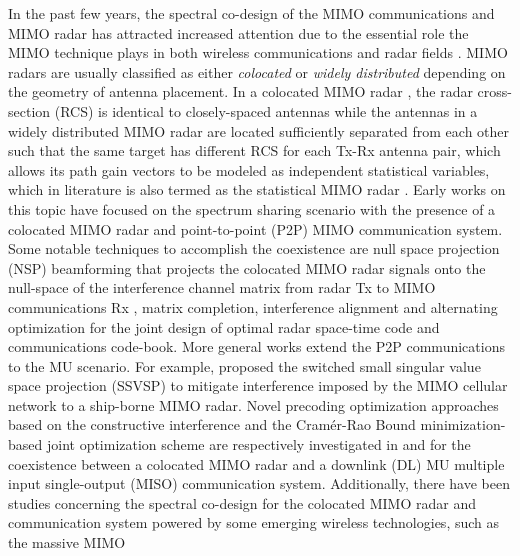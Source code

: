 \documentclass[9pt,journal]{IEEEtran}
\begin{document}
In the past few years, the spectral co-design of the MIMO communications and MIMO radar has attracted increased attention due to the essential role the MIMO technique plays in both wireless communications and radar fields \cite{MCMIMO_RadComm,qian2018joint,rihan2018optimum,liu2018mimo,MIMOCOMSecrecy,he2019performance,cheng2019miso,dokhanchi2020multi,alaee2020information}. 
MIMO radars 
are usually classified as either \textit{colocated} or \textit{widely distributed} depending on the geometry of antenna placement. In a colocated MIMO radar \cite{mishra2019cognitive}, the radar cross-section (RCS) is identical to closely-spaced antennas while the antennas in a widely distributed MIMO radar are located sufficiently separated from each other such that the same target has different RCS for each Tx-Rx antenna pair, which allows its path gain vectors to be modeled as independent statistical variables, which in literature is also termed as the statistical MIMO radar \cite{hongbin_movingtarget,Jammer_game,NaghshTSP2017,sun2019target}. 
Early works on this topic have focused on the spectrum sharing scenario with the presence of a colocated MIMO radar and point-to-point (P2P) MIMO communication system\cite{khawar2015target,MCMIMO_RadComm,qian2018joint,2019arXiv190707943G}. Some notable techniques to accomplish the coexistence are null space projection (NSP) beamforming that projects the colocated MIMO radar signals onto the null-space of the interference channel matrix from radar Tx to MIMO communications Rx \cite{khawar2015target}, matrix completion\cite{MCMIMO_RadComm}, interference alignment \cite{rihan2018optimum} and alternating optimization for the joint design of optimal radar space-time code and communications code-book\cite{qian2018joint}. More general works extend the P2P communications to the MU scenario. For example, \cite{mahal2017spectral} proposed the switched small singular value space projection (SSVSP) to mitigate interference imposed by the MIMO cellular network to a ship-borne MIMO radar. Novel precoding optimization approaches based on the constructive interference and the Cram\'er-Rao Bound minimization-based joint optimization scheme are respectively investigated in \cite{liu2018mu} and \cite{cheng2019miso} for the coexistence between a colocated MIMO radar and a downlink (DL) MU multiple input single-output (MISO) communication system. Additionally, there have been studies concerning the spectral co-design for the colocated MIMO radar and communication system powered by some emerging wireless technologies, such as the massive MIMO \cite{d2020uplink} %
\end{document}
